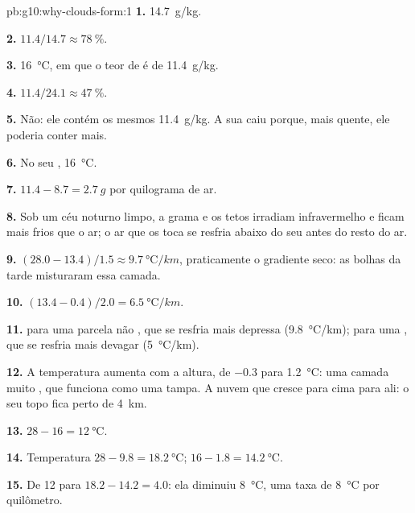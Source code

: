 \begin{solution}{pb:g10:why-clouds-form:1}
\textbf{1.} \qty{14.7}{g/kg}.

\textbf{2.} $11.4/14.7 \approx \qty{78}{\percent}$.

\textbf{3.} \qty{16}{\degreeCelsius}, em que o teor de  é de
\qty{11.4}{g/kg}.

\textbf{4.} $11.4/24.1 \approx \qty{47}{\percent}$.

\textbf{5.} Não: ele contém os mesmos \qty{11.4}{g/kg}. A sua  caiu porque, mais quente, ele poderia conter mais.

\textbf{6.} No seu , \qty{16}{\degreeCelsius}.

\textbf{7.} $11.4 - 8.7 = \qty{2.7}{g}$ por quilograma de ar.

\textbf{8.} Sob um céu noturno limpo, a grama e os tetos irradiam
infravermelho e ficam mais frios que o ar; o ar que os toca se resfria
abaixo do seu  antes do resto do ar.

\textbf{9.} $(28.0 - 13.4)/1.5 \approx \qty{9.7}{\degreeCelsius/km}$,
praticamente o gradiente seco: as bolhas da tarde misturaram essa camada.

\textbf{10.} $(13.4 - 0.4)/2.0 = \qty{6.5}{\degreeCelsius/km}$.

\textbf{11.}  para uma parcela não , que se resfria mais
depressa (\qty{9.8}{\degreeCelsius/km});  para uma , que se
resfria mais devagar (\qty{5}{\degreeCelsius/km}).

\textbf{12.} A temperatura aumenta com a altura, de \num{-0.3} para
\qty{1.2}{\degreeCelsius}: uma camada muito , que funciona como uma
tampa. A nuvem que cresce para cima para ali: o seu topo fica perto de
\qty{4}{km}.

\textbf{13.} $28 - 16 = \qty{12}{\degreeCelsius}$.

\textbf{14.} Temperatura $28 - 9.8 = \qty{18.2}{\degreeCelsius}$;  $16 - 1.8 = \qty{14.2}{\degreeCelsius}$.

\textbf{15.} De 12 para $18.2 - 14.2 = 4.0$: ela diminuiu
\qty{8}{\degreeCelsius}, uma taxa de \qty{8}{\degreeCelsius} por quilômetro.


\end{solution}
